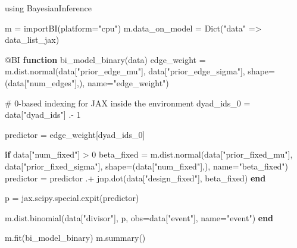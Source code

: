 \documentclass[
  letterpaper,
  DIV=11,
  numbers=noendperiod]{scrartcl}
\newenvironment{Shaded}{\begin{snugshade}}{\end{snugshade}}
\newcommand{\BuiltInTok}[1]{\textcolor[rgb]{0.00,0.23,0.31}{#1}}
\newcommand{\CommentTok}[1]{\textcolor[rgb]{0.37,0.37,0.37}{#1}}
\newcommand{\ControlFlowTok}[1]{\textcolor[rgb]{0.00,0.23,0.31}{\textbf{#1}}}
\newcommand{\FloatTok}[1]{\textcolor[rgb]{0.68,0.00,0.00}{#1}}
\newcommand{\FunctionTok}[1]{\textcolor[rgb]{0.28,0.35,0.67}{#1}}
\newcommand{\ImportTok}[1]{\textcolor[rgb]{0.00,0.46,0.62}{#1}}
\newcommand{\KeywordTok}[1]{\textcolor[rgb]{0.00,0.23,0.31}{\textbf{#1}}}
\newcommand{\NormalTok}[1]{\textcolor[rgb]{0.00,0.23,0.31}{#1}}
\newcommand{\OperatorTok}[1]{\textcolor[rgb]{0.37,0.37,0.37}{#1}}
\newcommand{\PreprocessorTok}[1]{\textcolor[rgb]{0.68,0.00,0.00}{#1}}
\newcommand{\StringTok}[1]{\textcolor[rgb]{0.13,0.47,0.30}{#1}}
\begin{document}
\begin{Shaded}
\begin{Highlighting}[]
\ImportTok{using} \BuiltInTok{BayesianInference}

\NormalTok{m }\OperatorTok{=} \FunctionTok{importBI}\NormalTok{(platform}\OperatorTok{=}\StringTok{"cpu"}\NormalTok{)}
\NormalTok{m.data\_on\_model }\OperatorTok{=} \FunctionTok{Dict}\NormalTok{(}\StringTok{"data"} \OperatorTok{=\textgreater{}}\NormalTok{ data\_list\_jax)}

\PreprocessorTok{@BI} \KeywordTok{function} \FunctionTok{bi\_model\_binary}\NormalTok{(data)}
\NormalTok{    edge\_weight }\OperatorTok{=}\NormalTok{ m.dist.}\FunctionTok{normal}\NormalTok{(data[}\StringTok{"prior\_edge\_mu"}\NormalTok{], data[}\StringTok{"prior\_edge\_sigma"}\NormalTok{], }
\NormalTok{                                shape}\OperatorTok{=}\NormalTok{(data[}\StringTok{"num\_edges"}\NormalTok{],), name}\OperatorTok{=}\StringTok{"edge\_weight"}\NormalTok{)}
    
    \CommentTok{\# 0{-}based indexing for JAX inside the environment}
\NormalTok{    dyad\_ids\_0 }\OperatorTok{=}\NormalTok{ data[}\StringTok{"dyad\_ids"}\NormalTok{] }\OperatorTok{.{-}} \FloatTok{1}
    
\NormalTok{    predictor }\OperatorTok{=}\NormalTok{ edge\_weight[dyad\_ids\_0]}
    
    \ControlFlowTok{if}\NormalTok{ data[}\StringTok{"num\_fixed"}\NormalTok{] }\OperatorTok{\textgreater{}} \FloatTok{0}
\NormalTok{        beta\_fixed }\OperatorTok{=}\NormalTok{ m.dist.}\FunctionTok{normal}\NormalTok{(data[}\StringTok{"prior\_fixed\_mu"}\NormalTok{], data[}\StringTok{"prior\_fixed\_sigma"}\NormalTok{], }
\NormalTok{                                   shape}\OperatorTok{=}\NormalTok{(data[}\StringTok{"num\_fixed"}\NormalTok{],), name}\OperatorTok{=}\StringTok{"beta\_fixed"}\NormalTok{)}
\NormalTok{        predictor }\OperatorTok{=}\NormalTok{ predictor }\OperatorTok{.+}\NormalTok{ jnp.}\FunctionTok{dot}\NormalTok{(data[}\StringTok{"design\_fixed"}\NormalTok{], beta\_fixed)}
    \ControlFlowTok{end}
    
\NormalTok{    p }\OperatorTok{=}\NormalTok{ jax.scipy.special.}\FunctionTok{expit}\NormalTok{(predictor)}
    
\NormalTok{    m.dist.}\FunctionTok{binomial}\NormalTok{(data[}\StringTok{"divisor"}\NormalTok{], p, obs}\OperatorTok{=}\NormalTok{data[}\StringTok{"event"}\NormalTok{], name}\OperatorTok{=}\StringTok{"event"}\NormalTok{)}
\KeywordTok{end}

\NormalTok{m.}\FunctionTok{fit}\NormalTok{(bi\_model\_binary)}
\NormalTok{m.}\FunctionTok{summary}\NormalTok{()}
\end{Highlighting}
\end{Shaded}
\end{document}
